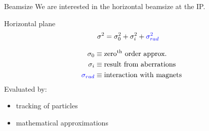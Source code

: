\documentclass{beamer}
\begin{document}
\begin{frame}{Beamsize}
We are interested in the horizontal beamsize at the IP.
\begin{multicols}{1}
Horizontal plane
 \begin{align*}
\sigma^2 &= \sigma_0^2 + \sigma_i^2 +{\color{blue}	\sigma_{rad}^2}
\end{align*}
\end{multicols}
\begin{align*}
 \sigma_0 &\equiv \text{zero$^{\text{th}}$ order approx.}\\
 \sigma_i &\equiv \text{result from aberrations}\\
 {\color{blue}\sigma_{rad}} &\equiv \text{interaction with magnets}
\end{align*}
Evaluated by:
\begin{itemize}
 \item tracking of particles
 \item mathematical approximations
\end{itemize}
\end{frame}
\end{document}
